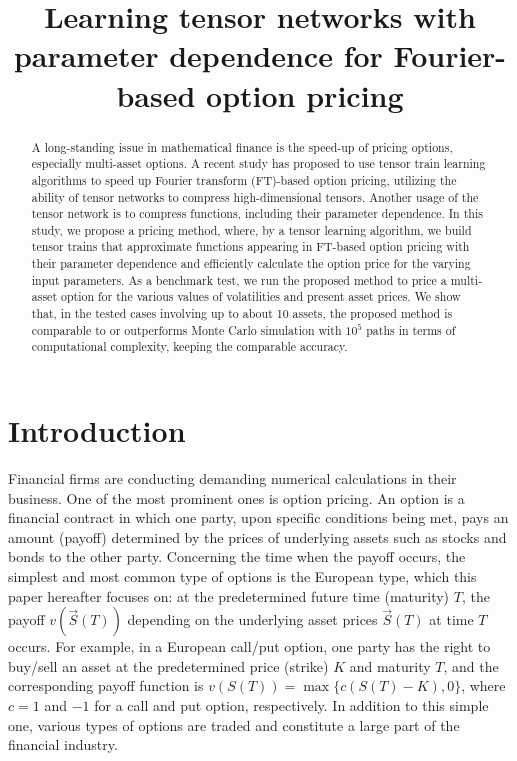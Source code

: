 
\title{Learning tensor networks with parameter dependence for Fourier-based option pricing}
\begin{abstract}
A long-standing issue in mathematical finance is the speed-up of pricing options, especially multi-asset options.
A recent study has proposed to use tensor train learning algorithms to speed up Fourier transform (FT)-based option pricing, utilizing the ability of tensor networks to compress high-dimensional tensors. 
Another usage of the tensor network is to compress functions, including their parameter dependence. 
In this study, we propose a pricing method, where, by a tensor learning algorithm, we build tensor trains that approximate functions appearing in FT-based option pricing with their parameter dependence and efficiently calculate the option price for the varying input parameters.
As a benchmark test, we run the proposed method to price a multi-asset option for the various values of volatilities and present asset prices.
We show that, in the tested cases involving up to about 10 assets, the proposed method is comparable to or outperforms Monte Carlo simulation with $10^5$ paths in terms of computational complexity, keeping the comparable accuracy.

\end{abstract}
\maketitle

\section{Introduction}
Financial firms are conducting demanding numerical calculations in their business.
One of the most prominent ones is option pricing.
An option is a financial contract in which one party, upon specific conditions being met, pays an amount (payoff) determined by the prices of underlying assets such as stocks and bonds to the other party.
Concerning the time when the payoff occurs, the simplest and most common type of options is the European type, which this paper hereafter focuses on: at the predetermined future time (maturity) $T$, the payoff $v(\vec{S}(T))$ depending on the underlying asset prices $\vec{S}(T)$ at time $T$ occurs.
For example, in a European call/put option, one party has the right to buy/sell an asset at the predetermined price (strike) $K$ and maturity $T$, and the corresponding payoff function is $v(S(T))=\max\{c(S(T)-K),0\}$, where $c=1$ and $-1$ for a call and put option, respectively.
In addition to this simple one, various types of options are traded and constitute a large part of the financial industry.

